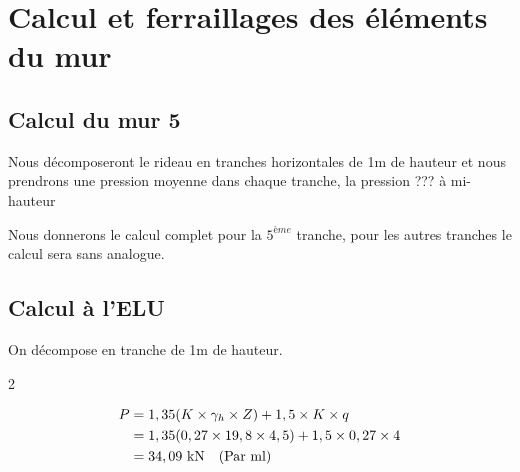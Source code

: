 \documentclass[12pt,a4paper]{report}
\begin{document}
	\chapter{Calcul et ferraillages des éléments du mur}
	
	\section{Calcul du mur 5}
	
	Nous décomposeront le rideau en tranches horizontales de 1m de hauteur et nous prendrons une pression moyenne dans chaque tranche, la pression ??? à mi-hauteur
	
	Nous donnerons le calcul complet pour la $5^{ème}$ tranche, pour les autres tranches le calcul sera sans analogue.
	
	\section{Calcul à l'ELU}
	
	
	On décompose en tranche de 1m de hauteur.
	
	\begin{multicols}{2}
		
		
		\[ \begin{aligned}
			P &= 1,35(K \times \gamma_{h} \times Z) + 1,5 \times K \times q \\
			&= 1,35(0,27 \times 19,8 \times 4,5) + 1,5 \times 0,27 \times 4 \\
			&= 34,09\kn \quad (\text{Par ml}) 
		\end{aligned} \]
		
		\columnbreak
		
	\end{multicols}
	
\end{document}
